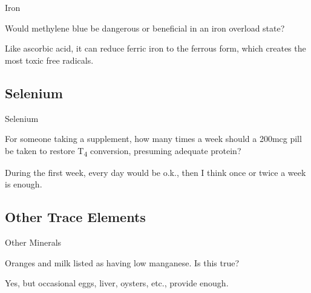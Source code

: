 \documentclass[11pt,oneside,openany,extrafontsizes]{memoir}
\begin{document}
\begin{qaexchange}{Iron}

    \begin{question}
        Would methylene blue be dangerous or beneficial in an iron overload state?
    \end{question}

    \begin{answer}
        Like ascorbic acid, it can reduce ferric iron to the ferrous form, which creates the most toxic free radicals.
    \end{answer}
\end{qaexchange}

\subsection{Selenium}

\begin{qaexchange}{Selenium}

    \begin{question}
        For someone taking a supplement, how many times a week should a 200mcg pill be taken to restore T\textsubscript{4} conversion, presuming adequate protein?
    \end{question}

    \begin{answer}
      During the first week, every day would be o.k., then I think once or twice a week is enough.
    \end{answer}
\end{qaexchange}

\subsection{Other Trace Elements}

\begin{qaexchange}{Other Minerals}

    \begin{question}
        Oranges and milk listed as having low manganese. Is this true?
    \end{question}

    \begin{answer}
        Yes, but occasional eggs, liver, oysters, etc., provide enough.
    \end{answer}
\end{qaexchange}
\end{document}
